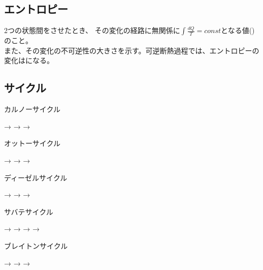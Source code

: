 \documentclass[a4paper]{jsarticle}
\begin{document}
\subsection{エントロピー}
2つの状態間をさせたとき、
その変化の経路に無関係に$\displaystyle\int \frac{dQ}{T}=const$となる値()のこと。\\
また、その変化の不可逆性の大きさを示す。可逆断熱過程では、エントロピーの変化はになる。
\subsection{サイクル}
\begin{itembox}[l]{カルノーサイクル}
    \begin{center}
        \quad → \quad {} \quad → \quad {} \quad → \quad {}
    \end{center}
\end{itembox}
\begin{itembox}[l]{オットーサイクル}
    \begin{center}
        \quad → \quad {} \quad → \quad {} \quad → \quad {}
    \end{center}
\end{itembox}
\begin{itembox}[l]{ディーゼルサイクル}
    \begin{center}
        \quad → \quad {} \quad → \quad {} \quad → \quad {}
    \end{center}
\end{itembox}
\begin{itembox}[l]{サバテサイクル}
    \begin{center}
        \quad → \quad {}\quad → \quad {} \quad → \quad {} \quad → \quad {}
    \end{center}
\end{itembox}
\begin{itembox}[l]{ブレイトンサイクル}
    \begin{center}
        \quad → \quad {} \quad → \quad {} \quad → \quad {}
    \end{center}
\end{itembox}
\end{document}

